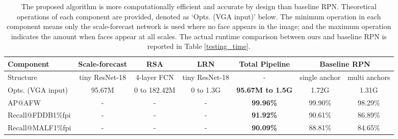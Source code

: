 \documentclass[10pt,twocolumn,letterpaper]{article}
\begin{document}
\begin{table}
	\caption{The proposed algorithm is more computationally efficient and accurate by design than baseline RPN.
		Theoretical operations of each component are provided, denoted as `Opts. (VGA input)' below.
		The minimum operation in each component means only the scale-forecast network is used where no face appears in the image; and the maximum operation indicates the amount when faces appear at all scales.
		The actual runtime comparison between ours and baseline RPN is reported in Table \ref{testing_time}.
	}
	\vspace{-.2cm}
	\footnotesize{
		\begin{center}
			\begin{tabular}{ l|c  c c c | c c}
				\toprule
				Component  & Scale-forecast & RSA & LRN  & Total Pipeline & \multicolumn{2}{c}{Baseline RPN}\\
				\midrule
				Structure & tiny ResNet-18 & 4-layer FCN & tiny ResNet-18 & - & single anchor & multi anchors \\
				Opts. (VGA input) & 95.67M & 0 to 182.42M & 0 to 1.3G & \textbf{95.67M to 1.5G} & 1.72G & 1.31G\\
				\midrule
				AP@AFW	& - & - & - & \textbf{99.96\%} & 99.90\% & 98.29\% \\
				Recall@FDDB1\%fpi & - & - & - & \textbf{91.92\%} & 90.61\% & 86.89\% \\
				Recall@MALF1\%fpi & - & - & - & \textbf{90.09\%} & 88.81\% & 84.65\% \\
				\bottomrule
			\end{tabular}
		\end{center}
	}
	\label{network_details}
	\vspace{-.5cm}
\end{table}
\end{document}
